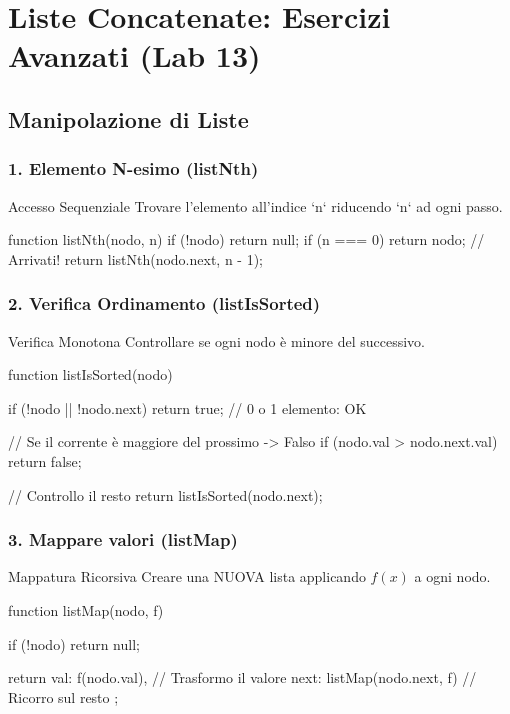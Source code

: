 \section{Liste Concatenate: Esercizi Avanzati (Lab 13)}

\subsection{Manipolazione di Liste}

\subsubsection{1. Elemento N-esimo (listNth)}
\begin{concept}{Accesso Sequenziale}
Trovare l'elemento all'indice `n` riducendo `n` ad ogni passo.
\end{concept}
\begin{jsbox}
function listNth(nodo, n) {
    if (!nodo) return null;
    if (n === 0) return nodo; // Arrivati!
    return listNth(nodo.next, n - 1);
}
\end{jsbox}

\subsubsection{2. Verifica Ordinamento (listIsSorted)}
\begin{concept}{Verifica Monotona}
Controllare se ogni nodo è minore del successivo.
\end{concept}
\begin{jsbox}
function listIsSorted(nodo) {
    if (!nodo || !nodo.next) return true; // 0 o 1 elemento: OK
    
    // Se il corrente è maggiore del prossimo -> Falso
    if (nodo.val > nodo.next.val) return false;
    
    // Controllo il resto
    return listIsSorted(nodo.next);
}
\end{jsbox}

\subsubsection{3. Mappare valori (listMap)}
\begin{concept}{Mappatura Ricorsiva}
Creare una NUOVA lista applicando $f(x)$ a ogni nodo.
\end{concept}
\begin{jsbox}
function listMap(nodo, f) {
    if (!nodo) return null;
    
    return {
        val: f(nodo.val),       // Trasformo il valore
        next: listMap(nodo.next, f) // Ricorro sul resto
    };
}
\end{jsbox}

